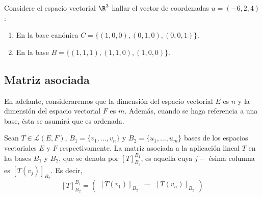 \documentclass[compacto,10pt]{pubciencias-notas}
\begin{document}
\begin{ejer}
Considere el espacio vectorial $\R^{3}$ hallar el vector de coordenadas $u=(-6,2,4)$:
\begin{enumerate}
    \item En la base can\'onica $C=\{(1,0,0),(0,1,0),(0,0,1)\}$.
    \item  En la base  $B=\{(1,1,1),(1,1,0),(1,0,0)\}$.
\end{enumerate}
\end{ejer}

\setcounter{subsection}{5}
\subsection{Matriz asociada}

En adelante, consideraremos que la dimensión 
del espacio vectorial $E$ es $n$ y la dimensión del espacio vectorial $F$ es $m$. Además, cuando se haga referencia a una base, ésta se asumirá que es ordenada.


\begin{defi}
    Sean $T \in \mathscr{L}(E,F)$, $B_{1} = \{ v_{1}, \ldots, v_{n} \}$ y $B_{2} = \{ u_{1}, \ldots, u_{m} \}$ bases de los espacios vectoriales $E$ y $F$ respectivamente. La matriz asociada a la aplicación lineal $T$ en las bases $B_{1}$ y $B_{2}$, que se denota por $[T]^{B_{1}}_{B_{2}}$, es aquella cuya $j-$ ésima columna es $[T(v_{j})]_{B_{2}}$. Es decir,
    \[
        [T]_{B_{2}}^{B_{1}} =
        \begin{pmatrix}
            [T(v_{1})]_{B_{2}} & \cdots & [T(v_{n})]_{B_{2}}
        \end{pmatrix}
    \]
\end{defi}
\end{document}

